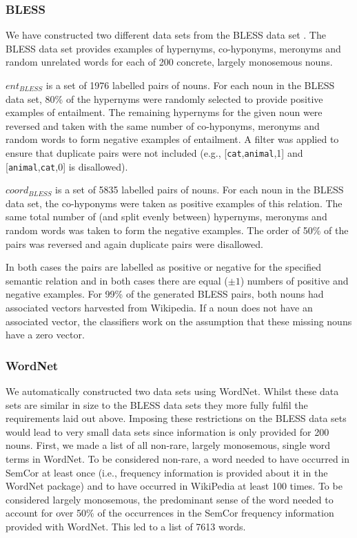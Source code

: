 \documentclass[11pt]{article}
\begin{document}
\subsubsection{BLESS}
We have constructed two different data sets from the BLESS data set \cite{Baroni2011}.  The BLESS data set provides examples of hypernyms, co-hyponyms, meronyms and random unrelated words for each of 200 concrete, largely monosemous nouns.

$ent_{BLESS}$ is a set of 1976 labelled pairs of nouns.  For each noun in the BLESS data set, 80\% of the hypernyms were randomly selected to provide positive examples of entailment.  The remaining hypernyms for the given noun were reversed and taken with the same number of co-hyponyms, meronyms and random words to form negative examples of entailment.  A filter was applied to ensure that duplicate pairs were not included (e.g., [\texttt{cat},\texttt{animal},1] and [\texttt{animal},\texttt{cat},0] is disallowed). 

$coord_{BLESS}$ is a set of 5835 labelled pairs of nouns.  For each noun in the BLESS data set, the co-hyponyms were taken as positive examples of this relation.  The same total number of (and split evenly between) hypernyms, meronyms and random words was taken to form the negative examples.  The order of 50\% of the pairs was reversed and again duplicate pairs were disallowed. 

In both cases the pairs are labelled as positive or negative for the specified semantic relation and in both cases there are equal ($\pm 1$) numbers of positive and negative examples.  For 99\% of the generated BLESS pairs, both nouns had associated vectors harvested from Wikipedia.  If a noun does not have an associated vector, the classifiers work on the assumption that these missing nouns have a zero vector.  

\subsubsection{WordNet}

We automatically constructed two data sets using WordNet.  Whilst these data sets are similar in size to the BLESS data sets they more fully fulfil the requirements laid out above.  Imposing these restrictions on the BLESS data sets would lead to very small data sets since information is only provided for 200 nouns.  First, we made a list of all non-rare, largely monosemous, single word terms in WordNet.  To be considered non-rare, a word needed to have occurred in SemCor at least once (i.e., frequency information is provided about it in the WordNet package) and to have occurred in WikiPedia at least 100 times.  To be considered largely monosemous, the predominant sense of the word needed to account for over 50\% of the occurrences in the SemCor frequency information provided with WordNet.  This led to a list of 7613 words. 
\end{document}
